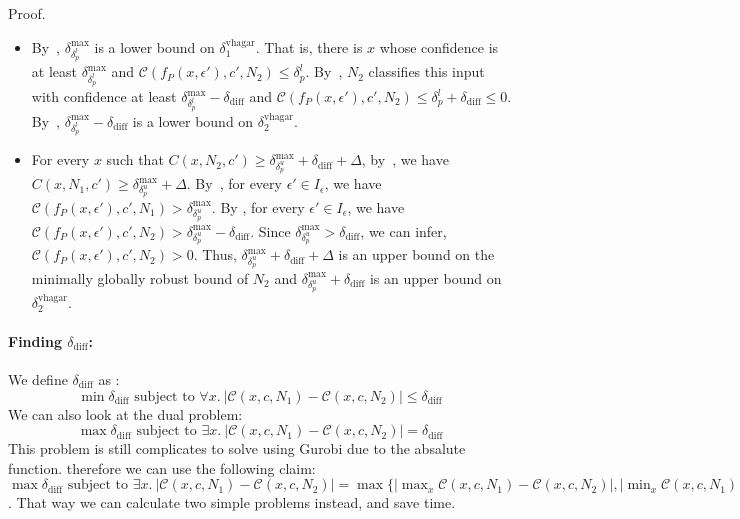 \documentclass[11pt]{article}
\begin{document}
 Proof. \begin{itemize}
   \item 
 By~, ${\delta^\text{max}_{\delta^l_p}}$ is a lower bound on $\delta^\text{vhagar}_1$.
 That is, there is $x$ whose confidence is at least ${\delta^\text{max}_{\delta^l_p}}$
 and $\mathcal{C}(f_P(x,\epsilon'),c',N_2)\leq {\delta^l_p}$.
 By~, $N_2$ classifies this input with confidence at least ${\delta^\text{max}_{\delta^l_p}}-\delta_\text{diff}$
 and $\mathcal{C}(f_P(x,\epsilon'),c',N_2)\leq {\delta^l_p}+\delta_\text{diff}\leq 0$.
 By~, ${\delta^\text{max}_{\delta^l_p}}-\delta_\text{diff}$ is a lower bound on $\delta^\text{vhagar}_2$.
 \item %
 For every $x$ such that $C(x,N_2,c')\geq {\delta^\text{max}_{\delta^u_p}} + \delta_\text{diff} +\Delta$, by~, we have
  $C(x,N_1,c')\geq {\delta^\text{max}_{\delta^u_p}} +\Delta$. By~, for every $\epsilon'\in I_\epsilon$, we have $\mathcal{C}(f_P(x,\epsilon'),c',N_1)>{\delta^\text{max}_{\delta^u_p}}$. 
 By , for every $\epsilon'\in I_\epsilon$, we have $\mathcal{C}(f_P(x,\epsilon'),c',N_2)>{\delta^\text{max}_{\delta^u_p}}-\delta_\text{diff}$. 
 Since ${\delta^\text{max}_{\delta^u_p}}>\delta_\text{diff}$, 
 we can infer, $\mathcal{C}(f_P(x,\epsilon'),c',N_2)>0$. Thus, ${\delta^\text{max}_{\delta^u_p}} + \delta_\text{diff} +\Delta$ is an upper bound on the minimally globally robust bound of $N_2$ and ${\delta^\text{max}_{\delta^u_p}} + \delta_\text{diff}$ is an upper bound on  $\delta^\text{vhagar}_2$.
 \end{itemize}
 
 
 \paragraph{Finding $\delta_\text{diff}$:}
 We define $\delta_\text{diff}$ as :
 $$\min \delta_\text{diff}\text{ subject to } \forall x.\ |\mathcal{C}(x,c,N_1)-\mathcal{C}(x,c,N_2)|\leq \delta_\text{diff}$$
 We can also look at the dual problem:
 $$\max \delta_\text{diff}\text{ subject to } \exists x.\ |\mathcal{C}(x,c,N_1)-\mathcal{C}(x,c,N_2)|=\delta_\text{diff}$$
 This problem is still complicates to solve using Gurobi due to the absalute function. therefore we can use the following claim:
 $\max \delta_\text{diff}\text{ subject to } \exists x.\ |\mathcal{C}(x,c,N_1)-\mathcal{C}(x,c,N_2)|= \max \{|\max_x \mathcal{C}(x,c,N_1)-\mathcal{C}(x,c,N_2)|,|\min_x \mathcal{C}(x,c,N_1)-\mathcal{C}(x,c,N_2)|\}=\delta_\text{diff}$. That way we can calculate two simple problems instead, and save time.
 
\end{document}
